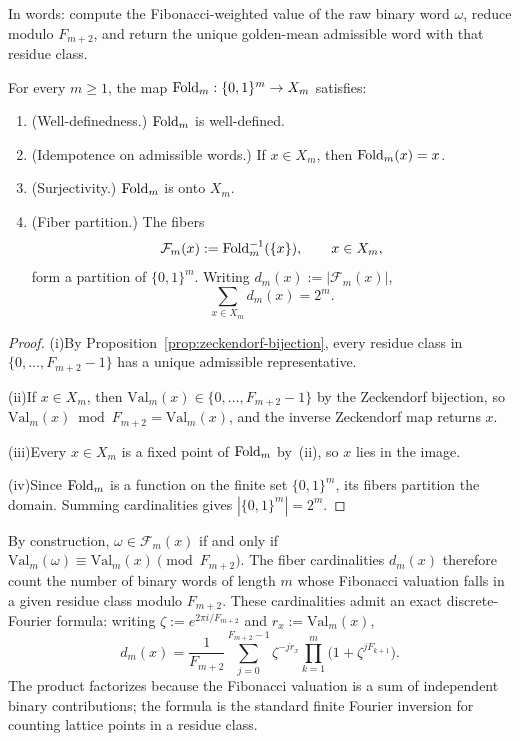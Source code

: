 In words: compute the Fibonacci-weighted value of the raw binary word $\omega$, reduce modulo $F_{m+2}$, and return the unique golden-mean admissible word with that residue class.

\begin{theorem}\label{thm:fold-properties}
For every $m\ge 1$, the map $\mathrm{Fold}_m:\{0,1\}^m\to X_m$ satisfies:
\begin{enumerate}[label=(\roman*),leftmargin=*,itemsep=2pt]
\item \textup{(Well-definedness.)} $\mathrm{Fold}_m$ is well-defined.
\item \textup{(Idempotence on admissible words.)} If $x\in X_m$, then $\mathrm{Fold}_m(x)=x$.
\item \textup{(Surjectivity.)} $\mathrm{Fold}_m$ is onto $X_m$.
\item \textup{(Fiber partition.)} The fibers
\[
\mathcal F_m(x):=\mathrm{Fold}_m^{-1}(\{x\}),\qquad x\in X_m,
\]
form a partition of $\{0,1\}^m$. Writing $d_m(x):=|\mathcal F_m(x)|$,
\[
\sum_{x\in X_m}d_m(x)=2^m.
\]
\end{enumerate}
\end{theorem}

\begin{proof}
(i)\enspace By Proposition~\ref{prop:zeckendorf-bijection}, every residue class in $\{0,\dots,F_{m+2}-1\}$ has a unique admissible representative.

(ii)\enspace If $x\in X_m$, then $\mathrm{Val}_m(x)\in\{0,\dots,F_{m+2}-1\}$ by the Zeckendorf bijection, so $\mathrm{Val}_m(x)\bmod F_{m+2}=\mathrm{Val}_m(x)$, and the inverse Zeckendorf map returns $x$.

(iii)\enspace Every $x\in X_m$ is a fixed point of $\mathrm{Fold}_m$ by~(ii), so $x$ lies in the image.

(iv)\enspace Since $\mathrm{Fold}_m$ is a function on the finite set $\{0,1\}^m$, its fibers partition the domain. Summing cardinalities gives $|\{0,1\}^m|=2^m$.
\end{proof}

\begin{remark}\label{rem:fiber-residue}
By construction, $\omega\in\mathcal F_m(x)$ if and only if $\mathrm{Val}_m(\omega)\equiv\mathrm{Val}_m(x)\pmod{F_{m+2}}$. The fiber cardinalities $d_m(x)$ therefore count the number of binary words of length $m$ whose Fibonacci valuation falls in a given residue class modulo $F_{m+2}$. These cardinalities admit an exact discrete-Fourier formula: writing $\zeta:=e^{2\pi i/F_{m+2}}$ and $r_x:=\mathrm{Val}_m(x)$,
\begin{equation}\label{eq:fiber-dft}
d_m(x)=\frac{1}{F_{m+2}}\sum_{j=0}^{F_{m+2}-1}\zeta^{-jr_x}\prod_{k=1}^m\bigl(1+\zeta^{jF_{k+1}}\bigr).
\end{equation}
The product factorizes because the Fibonacci valuation is a sum of independent binary contributions; the formula is the standard finite Fourier inversion for counting lattice points in a residue class.
\end{remark}
